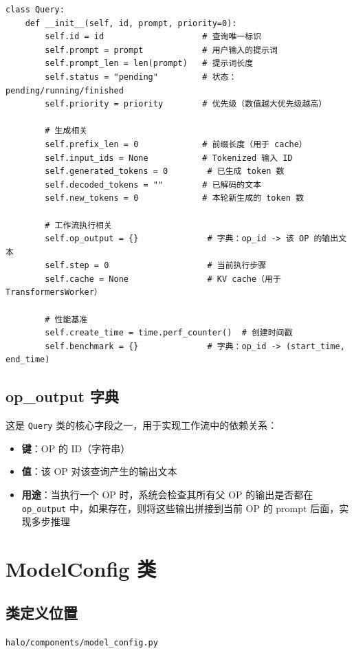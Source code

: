 \documentclass[12pt,a4paper]{article}
\begin{document}
\begin{lstlisting}
class Query:
    def __init__(self, id, prompt, priority=0):
        self.id = id                    # 查询唯一标识
        self.prompt = prompt            # 用户输入的提示词
        self.prompt_len = len(prompt)   # 提示词长度
        self.status = "pending"         # 状态：pending/running/finished
        self.priority = priority        # 优先级（数值越大优先级越高）
        
        # 生成相关
        self.prefix_len = 0             # 前缀长度（用于 cache）
        self.input_ids = None           # Tokenized 输入 ID
        self.generated_tokens = 0        # 已生成 token 数
        self.decoded_tokens = ""        # 已解码的文本
        self.new_tokens = 0             # 本轮新生成的 token 数
        
        # 工作流执行相关
        self.op_output = {}              # 字典：op_id -> 该 OP 的输出文本
        self.step = 0                    # 当前执行步骤
        self.cache = None                # KV cache（用于 TransformersWorker）
        
        # 性能基准
        self.create_time = time.perf_counter()  # 创建时间戳
        self.benchmark = {}              # 字典：op_id -> (start_time, end_time)
\end{lstlisting}

\subsection{op\_output 字典}
这是 \texttt{Query} 类的核心字段之一，用于实现工作流中的依赖关系：
\begin{itemize}
    \item \textbf{键}：OP 的 ID（字符串）
    \item \textbf{值}：该 OP 对该查询产生的输出文本
    \item \textbf{用途}：当执行一个 OP 时，系统会检查其所有父 OP 的输出是否都在 \texttt{op\_output} 中，如果存在，则将这些输出拼接到当前 OP 的 prompt 后面，实现多步推理
\end{itemize}

\section{ModelConfig 类}

\subsection{类定义位置}
\texttt{halo/components/model\_config.py}
\end{document}
